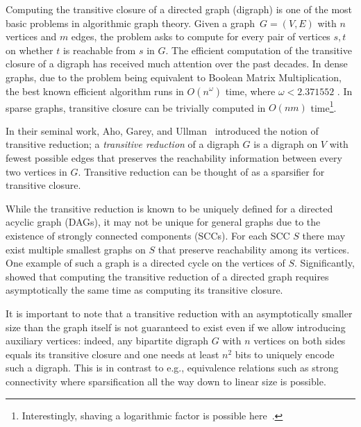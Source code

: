 \documentclass[11pt]{article}
\newcommand{\TR}[0]{\text{\( G^{t} \)}\xspace}
\begin{document}
Computing the transitive closure of a directed graph (digraph) is one of the most basic problems in algorithmic graph theory. Given a graph~$G=(V,E)$ with $n$ vertices and $m$ edges, the problem asks to compute for every pair of vertices $s,t$ on whether $t$ is reachable from $s$ in $G$. The efficient computation of the transitive closure of a digraph has received much attention over the past decades. 
In dense graphs, due to the problem being equivalent to Boolean Matrix Multiplication, the best known efficient algorithm runs in $O(n^\omega)$ time, where $\omega<2.371552$ \cite{strassen1969gaussian, coppersmith1982asymptotic, Williams12, williams2024new}. In sparse graphs, transitive closure can be trivially computed in $O(nm)$ time\footnote{Interestingly, shaving a logarithmic factor is possible here~\cite{Chan08}.}.


In their seminal work, Aho, Garey, and Ullman~\cite{Aho:1972aa} introduced the notion of transitive reduction; a \emph{transitive reduction} of a digraph $G$ is a digraph \TR on $V$ with fewest possible edges that preserves the reachability information between every two vertices in $G$.
Transitive reduction can be thought of as a sparsifier for transitive closure. 

While the transitive reduction is known to be uniquely defined for a directed acyclic graph (DAGs), it may not be unique for general graphs due to the existence of strongly connected components (SCCs). For each SCC $S$ there may exist multiple smallest graphs on $S$ that preserve reachability among its vertices. One example of such a graph is a directed cycle on the vertices of $S$. Significantly, \cite{Aho:1972aa} showed that computing the transitive reduction of a directed graph requires asymptotically the same time as computing its transitive closure.

It is important to note that a transitive reduction with an asymptotically smaller size than the graph itself is not guaranteed to exist even if we allow introducing auxiliary vertices: indeed, any bipartite digraph $G$ with $n$ vertices on both sides equals its transitive closure and one needs at least $n^2$ bits to uniquely encode such a digraph.
This is in contrast to e.g., equivalence relations such as strong connectivity where sparsification all the way down to linear size is possible.
\end{document}
